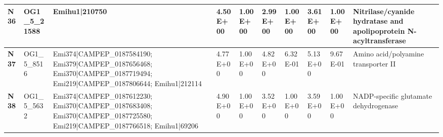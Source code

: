 \begin{landscape}
\begin{center}
\begin{footnotesize}
\begin{longtable}{|p{0.5cm}|p{1.5cm}|p{4cm}|l|l|l|l|l|l|l|}
\textbf{N36} & OG1\_5\_21588 & Emihu1|210750                                                                                                                                                                                                                                                                                                                                                                                                                                                                                                                                                                                                                            & 4.50E+00  & 1.00E+00 & 2.99E+00  & 1.00E+00 & 3.61E+00  & 1.00E+00 & Nitrilase/cyanide hydratase and apolipoprotein N-acyltransferase             \\ \hline
\textbf{N37} & OG1\_5\_8516  & Emi374|CAMPEP\_0187584190; Emi379|CAMPEP\_0187656468; Emi370|CAMPEP\_0187719494; Emi219|CAMPEP\_0187806644; Emihu1|212114                                                                                                                                                                                                                                                                                                                                                                                                                                                                                                                & 4.77E+00  & 1.00E+00 & 4.82E+00  & 6.32E-01 & 5.13E+00  & 9.67E-01 & Amino acid/polyamine transporter II                                          \\ \hline
\textbf{N38} & OG1\_5\_5632  & Emi374|CAMPEP\_0187612230; Emi370|CAMPEP\_0187683408; Emi370|CAMPEP\_0187725580; Emi219|CAMPEP\_0187766518; Emihu1|69206                                                                                                                                                                                                                                                                                                                                                                                                                                                                                                                 & 4.90E+00  & 1.00E+00 & 3.52E+00  & 1.00E+00 & 3.59E+00  & 1.00E+00 & NADP-specific glutamate dehydrogenase                                        \\ \hline

\end{longtable}
\end{footnotesize}
\end{center}
\end{landscape}
